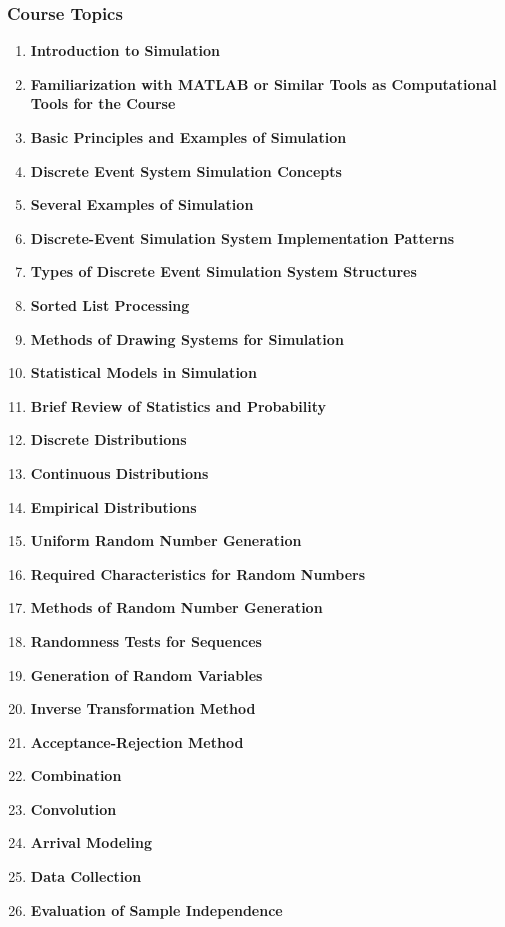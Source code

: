 \documentclass[12pt]{article}
\begin{document}
\subsubsection*{Course Topics}
\begin{enumerate}
    \item \textbf{Introduction to Simulation}
    \item \textbf{Familiarization with MATLAB or Similar Tools as Computational Tools for the Course}
    \item \textbf{Basic Principles and Examples of Simulation}
    \item \textbf{Discrete Event System Simulation Concepts}
    \item \textbf{Several Examples of Simulation}
    \item \textbf{Discrete-Event Simulation System Implementation Patterns}
    \item \textbf{Types of Discrete Event Simulation System Structures}
    \item \textbf{Sorted List Processing}
    \item \textbf{Methods of Drawing Systems for Simulation}
    \item \textbf{Statistical Models in Simulation}
    \item \textbf{Brief Review of Statistics and Probability}
    \item \textbf{Discrete Distributions}
    \item \textbf{Continuous Distributions}
    \item \textbf{Empirical Distributions}
    \item \textbf{Uniform Random Number Generation}
    \item \textbf{Required Characteristics for Random Numbers}
    \item \textbf{Methods of Random Number Generation}
    \item \textbf{Randomness Tests for Sequences}
    \item \textbf{Generation of Random Variables}
    \item \textbf{Inverse Transformation Method}
    \item \textbf{Acceptance-Rejection Method}
    \item \textbf{Combination}
    \item \textbf{Convolution}
    \item \textbf{Arrival Modeling}
    \item \textbf{Data Collection}
    \item \textbf{Evaluation of Sample Independence}

\end{enumerate}
\end{document}
